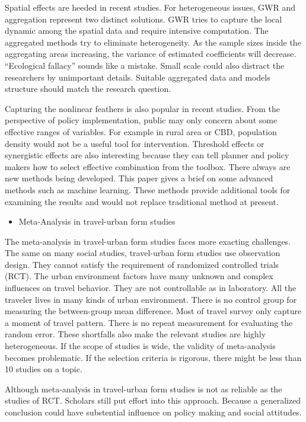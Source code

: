 \documentclass[
  11pt,
  openany]{memoir}
\providecommand{\tightlist}{%
  \setlength{\itemsep}{0pt}\setlength{\parskip}{0pt}}
\begin{document}
Spatial effects are heeded in recent studies. For heterogeneous issues, GWR and aggregation represent two distinct solutions.
GWR tries to capture the local dynamic among the spatial data and require intensive computation.
The aggregated methods try to eliminate heterogeneity. As the sample sizes inside the aggregating areas increasing, the variance of estimated coefficients will decrease.
``Ecological fallacy'' sounds like a mistake. Small scale could also distract the researchers by unimportant details.
Suitable aggregated data and models structure should match the research question.

Capturing the nonlinear feathers is also popular in recent studies.
From the perspective of policy implementation, public may only concern about some effective ranges of variables.
For example in rural area or CBD, population density would not be a useful tool for intervention.
Threshold effects or synergistic effects are also interesting because they can tell planner and policy makers how to select effective combination from the toolbox.
There always are new methods being developed.
This paper gives a brief on some advanced methods such as machine learning. These methods provide additional tools for examining the results and would not replace traditional method at present.

\begin{itemize}
\tightlist
\item
  Meta-Analysis in travel-urban form studies
\end{itemize}

The meta-analysis in travel-urban form studies faces more exacting challenges.
The same on many social studies, travel-urban form studies use observation design.
They cannot satisfy the requirement of randomized controlled trials (RCT).
The urban environment factors have many unknown and complex influences on travel behavior.
They are not controllable as in laboratory.
All the traveler lives in many kinds of urban environment.
There is no control group for measuring the between-group mean difference.
Most of travel survey only capture a moment of travel pattern.
There is no repeat measurement for evaluating the random error.
These shortfalls also make the relevant studies are highly heterogeneous.
If the scope of studies is wide, the validity of meta-analysis becomes problematic.
If the selection criteria is rigorous, there might be less than 10 studies on a topic.

Although meta-analysis in travel-urban form studies is not as reliable as the studies of RCT.
Scholars still put effort into this approach.
Because a generalized conclusion could have substential influence on policy making and social attitudes.
\end{document}
